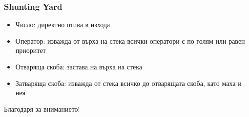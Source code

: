 \documentclass{beamer}
\begin{document}
\begin{frame}[fragile]
  \frametitle{Shunting Yard}
  \begin{itemize}
    \item Число: директно отива в изхода
    \item Оператор: изважда от върха на стека всички оператори с по-голям или равен приоритет
    \item Отваряща скоба: застава на върха на стека
    \item Затваряща скоба: изважда от стека всичко до отварящата скоба, като маха и нея
  \end{itemize}
\end{frame}


\begin{frame}
\centerline{Благодаря за вниманието!}
\end{frame}
\end{document}
